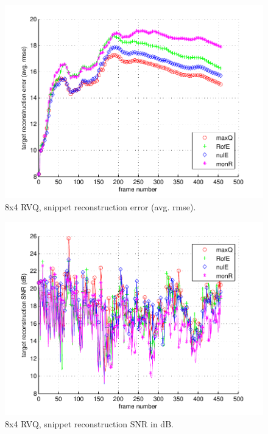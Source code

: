 								\begin{figure}[h!]
								\centering
								\includegraphics[height=0.4\textheight]{thesis/2_davidin300_8_4_1000_snp_armse.pdf}
								\caption{8x4 RVQ, snippet reconstruction error (avg. rmse).}
								\label{fig:2_davidin300_8_4_1000_snp_armse}
								\end{figure}

								\begin{figure}[h!]
								\centering
								\includegraphics[height=0.4\textheight]{thesis/2_davidin300_8_4_1000_snp_SNRdB.pdf}
								\caption{8x4 RVQ, snippet reconstruction SNR in dB.}
								\label{fig:2_davidin300_8_4_1000_snp_SNRdB}
								\end{figure}
\clearpage
\newpage
